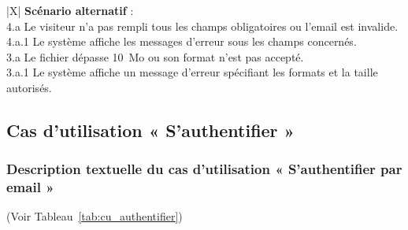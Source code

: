 \begin{xltabular}{\linewidth}{|X|}
    \hline
    \textbf{Scénario alternatif} : \\
    4.a Le visiteur n'a pas rempli tous les champs obligatoires ou l'email est invalide. \\
    \hspace{0.5cm} 4.a.1 Le système affiche les messages d'erreur sous les champs concernés. \\
    3.a Le fichier dépasse 10~Mo ou son format n'est pas accepté. \\
    \hspace{0.5cm} 3.a.1 Le système affiche un message d'erreur spécifiant les formats et la taille autorisés. \\
    \hline
\caption{Description textuelle du CU « Soumettre une candidature »}
\label{tab:cu_soumettre_candidature}
\end{xltabular}

\subsection{Cas d'utilisation « S'authentifier »}

\subsubsection{Description textuelle du cas d'utilisation « S'authentifier par email »}
(Voir Tableau~\ref{tab:cu_authentifier})

